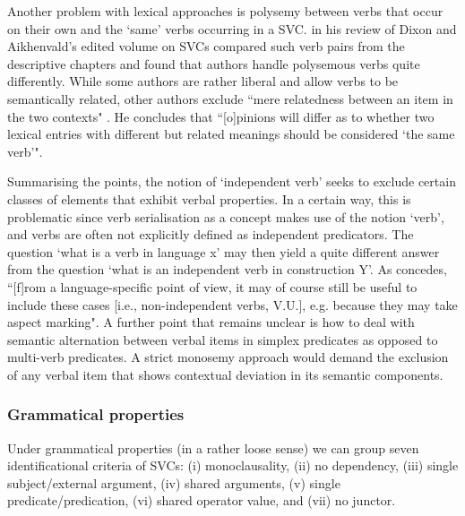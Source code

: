 Another problem with lexical approaches is polysemy between verbs that occur on their own and the `same' verbs occurring in a SVC. \citet{enfield2009review} in his review of Dixon and Aikhenvald's edited volume on SVCs compared such verb pairs from the descriptive chapters and found that authors handle polysemous verbs quite differently. While some authors are rather liberal and allow verbs to be semantically related, other authors exclude ``mere relatedness between an item in the two contexts" \citep[448]{enfield2009review}. He concludes that ``[o]pinions will differ as to whether two lexical entries with different but related meanings should be considered `the same verb’".

Summarising the points, the notion of `independent verb' seeks to exclude certain classes of elements that exhibit verbal properties. In a certain way, this is problematic since verb serialisation as a concept makes use of the notion `verb', and verbs are often not explicitly defined as independent predicators. The question `what is a verb in language x' may then yield a quite different answer from the question `what is an independent verb in construction Y'. As \citet[304]{haspelmath2016serial} concedes, ``[f]rom a language-specific point of view, it may of course still be useful to include these cases [i.e., non-independent verbs, V.U.], e.g. because they may take aspect marking". A further point that remains unclear is how to deal with semantic alternation between verbal items in simplex predicates as opposed to multi-verb predicates. A strict monosemy approach would demand the exclusion of any verbal item that shows contextual deviation in its semantic components.

\subsubsection{Grammatical properties}\label{sec:gramprop}

Under grammatical properties (in a rather loose sense) we can group seven identificational criteria of SVCs: (i) monoclausality, (ii) no dependency, (iii) single subject/external argument, (iv) shared arguments, (v) single predicate/predication, (vi) shared operator value, and (vii) no junctor.

